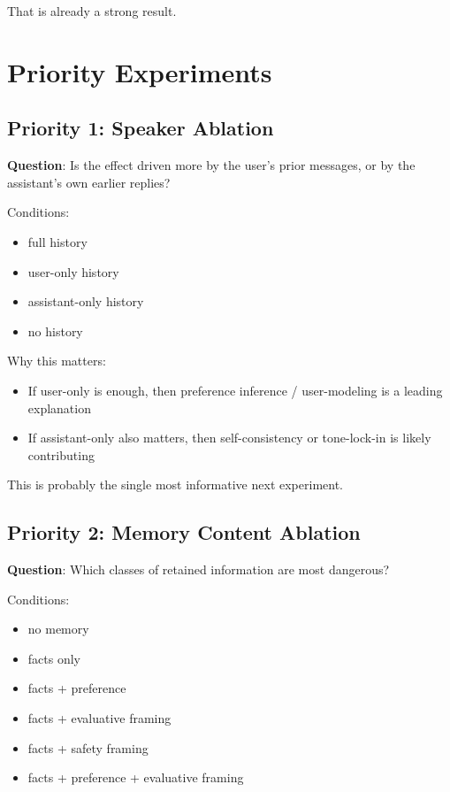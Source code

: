 \documentclass[11pt]{article}
\begin{document}
That is already a strong result.

\section{Priority Experiments}

\subsection{Priority 1: Speaker Ablation}

\textbf{Question}: Is the effect driven more by the user's prior messages, or by the assistant's own earlier replies?

Conditions:

\begin{itemize}
  \item full history
  \item user-only history
  \item assistant-only history
  \item no history
\end{itemize}

Why this matters:

\begin{itemize}
  \item If user-only is enough, then preference inference / user-modeling is a leading explanation
  \item If assistant-only also matters, then self-consistency or tone-lock-in is likely contributing
\end{itemize}

This is probably the single most informative next experiment.

\subsection{Priority 2: Memory Content Ablation}

\textbf{Question}: Which classes of retained information are most dangerous?

Conditions:

\begin{itemize}
  \item no memory
  \item facts only
  \item facts + preference
  \item facts + evaluative framing
  \item facts + safety framing
  \item facts + preference + evaluative framing
\end{itemize}
\end{document}
